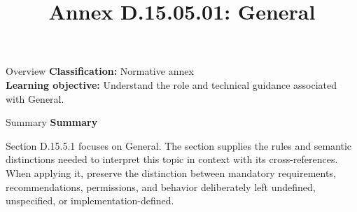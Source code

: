 \documentclass[10pt,letterpaper]{article}
\title{Annex D.15.05.01: General}
\author{}
\date{}
\begin{document}
\maketitle
\begin{CornellOverviewBox}{Overview}
\textbf{Classification:} Normative annex\\[2pt]
\textbf{Learning objective:} Understand the role and technical guidance associated with General.
\end{CornellOverviewBox}\begin{CornellSummaryBox}{Summary}
{\sffamily\bfseries\color{Accent} Summary}\par\vspace{3pt}Section D.15.5.1 focuses on General. The section supplies the rules and semantic distinctions needed to interpret this topic in context with its cross-references. When applying it, preserve the distinction between mandatory requirements, recommendations, permissions, and behavior deliberately left undefined, unspecified, or implementation-defined.
\end{CornellSummaryBox}
\end{document}
